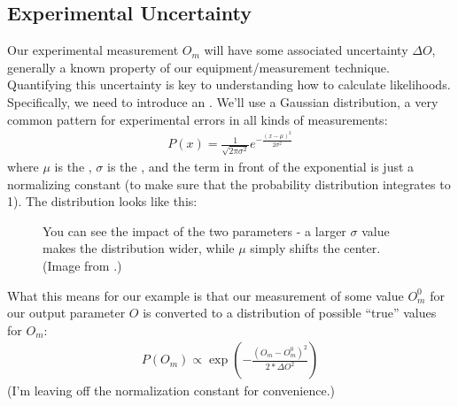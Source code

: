 \documentclass[letterpaper,10pt,english]{sphinxmanual}
\begin{document}
\subsection{Experimental Uncertainty}
\label{\detokenize{bayesics:experimental-uncertainty}}
Our experimental measurement \(O_m\) will have some associated uncertainty \(\Delta O\), generally a known property of our equipment/measurement technique. Quantifying this uncertainty is key to understanding how to calculate likelihoods. Specifically, we need to introduce an . We’ll use a Gaussian distribution, a very common pattern for experimental errors in all kinds of measurements:
\begin{equation}\label{equation:bayesics:bayesics:9}
\begin{split}P(x) = \frac{1}{\sqrt{2\pi\sigma^2}}e^{-\frac{(x-\mu)^2}{2\sigma^2}}\end{split}
\end{equation}
where \(\mu\) is the , \(\sigma\) is the , and the term in front of the exponential is just a normalizing constant (to make sure that the probability distribution integrates to 1). The distribution looks like this:

\begin{figure}[htbp]
\centering
\capstart

\noindent{}
\caption{You can see the impact of the two parameters - a larger \(\sigma\) value makes the distribution wider, while \(\mu\) simply shifts the center. (Image from .)}\label{\detokenize{bayesics:id2}}\end{figure}

What this means for our example is that our measurement of some value \(O_m^0\) for our output parameter \(O\) is converted to a distribution of possible “true” values for \(O_m\):
\begin{equation}\label{equation:bayesics:bayesics:10}
\begin{split}P(O_m) \propto \exp\left({-\frac{(O_m-O_m^0)^2}{2*\Delta O^2}}\right)\end{split}
\end{equation}
(I’m leaving off the normalization constant for convenience.)
\end{document}
